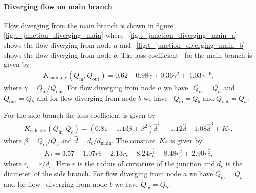 \paragraph{Diverging flow on main branch}

Flow diverging from the main branch is shown in figure \ref{fig:t_junction_diverging_main} where \ 
\ref{fig:t_junction_diverging_main_a} shows the flow diverging from node $a$ and \ 
\ref{fig:t_junction_diverging_main_b} shows the flow diverging from node $b$. The loss coefficient \ 
for the main branch is given by
\begin{align} \label{K_main_div}
    K_{\text{main,div}}(Q_{\text{in}}, Q_{\text{out}}) = 0.62 - 0.98 \gamma + 0.36 \gamma^2 + \
    0.03 \gamma^{-6},
\end{align}
where $\gamma = Q_{\text{in}} / Q_{\text{out}}$. For flow diverging from node $a$ we have \ 
$Q_{\text{in}} = Q_a$ and $Q_{\text{out}} = Q_b$ and for flow diverging from node $b$ we have \ 
$Q_{\text{in}} = Q_b$ and $Q_{\text{out}} = Q_a$.

For the side branch the loss coefficient is given by
\begin{align} \label{K_side_div}
    K_{\text{side,div}}(Q_{\text{in}}, Q_c) = \left(0.81-1.13\beta+\beta^2 \right)\hat{d}^4 \
    + 1.12 \hat{d} - 1.08\hat{d}^3 + K_{*},
\end{align}
where $\beta = Q_{\text{in}} / Q_c$ and $\hat{d} = d_c / d_{\text{main}}$. The constant\
$K_{*}$ is given by
\begin{align}
    K_{*} = 0.57 - 1.07 r_c^{\frac{1}{2}} -2.13 r_c + 8.24 r_c^{\frac{3}{2}} - 8.48 r_c^2 + \
    2.90 r_c^{\frac{5}{2}},
\end{align}
where $r_c = r / d_c$. Here $r$ is the radius of curvature of the junction and $d_c$ is the diameter\
of the side branch. For flow diverging from node $a$ we have $Q_{\text{in}} = Q_a$ and for flow \
diverging from node $b$ we have $Q_{\text{in}} = Q_b$.

